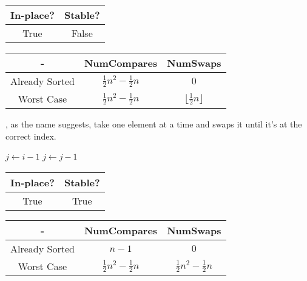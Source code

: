 \documentclass{report}
\begin{document}
\begin{center}
  \begin{tabular}{ | c | c | }
    \hline
    In-place? & Stable? \\
    \hline
    True & False \\
    \hline
  \end{tabular}
\end{center}

\begin{center}
  \begin{tabular}{ | c | c | c | }
    \hline
    - & NumCompares & NumSwaps \\
    \hline
    Already Sorted & $\frac{1}{2} n^2 - \frac{1}{2} n$ & $0$ \\
    \hline
    Worst Case &  $\frac{1}{2} n^2 - \frac{1}{2} n$ & $\lfloor \frac{1}{2} n \rfloor$ \\
    \hline
  \end{tabular}
\end{center}

, as the name suggests, take one element at a time and swaps it until it's at the correct index.

\noindent \hrulefill
\begin{algorithmic}[1]
   
      \State $j \gets i - 1$
      \State {} 
        \State $j \gets j - 1$
      \EndWhile
    \EndFor
    \State {}
  \EndFunction
\end{algorithmic}
\noindent \hrulefill

\begin{center}
  \begin{tabular}{ | c | c | }
    \hline
    In-place? & Stable? \\
    \hline
    True & True \\
    \hline
  \end{tabular}
\end{center}

\begin{center}
  \begin{tabular}{ | c | c | c | }
    \hline
    - & NumCompares & NumSwaps \\
    \hline
    Already Sorted & $n - 1$ & $0$ \\
    \hline
    Worst Case &  $\frac{1}{2} n^2 - \frac{1}{2} n$ & $\frac{1}{2} n^2 - \frac{1}{2} n$ \\
    \hline
  \end{tabular}
\end{center}
\end{document}
